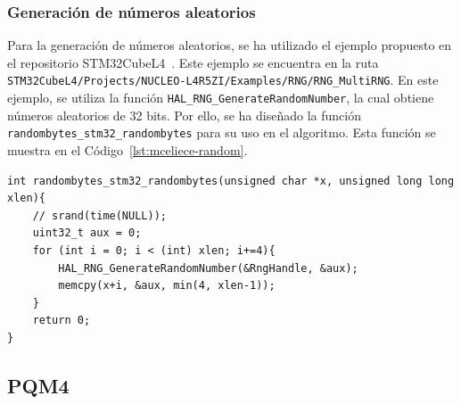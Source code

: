 \subsubsection{Generación de números aleatorios}\label{subsubsec:stm32-random}

Para la generación de números aleatorios, se ha utilizado el ejemplo propuesto en el repositorio STM32CubeL4~\cite{stm32cube}.
Este ejemplo se encuentra en la ruta \texttt{STM32CubeL4/Projects/NUCLEO-L4R5ZI/Examples/RNG/RNG\_MultiRNG}.
En este ejemplo, se utiliza la función \texttt{HAL\_RNG\_GenerateRandomNumber}, la cual obtiene números aleatorios de 32 bits.
Por ello, se ha diseñado la función \texttt{randombytes\_stm32\_randombytes} para su uso en el algoritmo.
Esta función se muestra en el Código~\ref{lst:mceliece-random}.

\begin{lstlisting}[label={lst:mceliece-random},style=Cnice,firstnumber=1,caption={Función de generación de números aleatorios para McEliece348864.}]
int randombytes_stm32_randombytes(unsigned char *x, unsigned long long xlen){
    // srand(time(NULL));
    uint32_t aux = 0;
    for (int i = 0; i < (int) xlen; i+=4){
        HAL_RNG_GenerateRandomNumber(&RngHandle, &aux);
        memcpy(x+i, &aux, min(4, xlen-1));
    }
    return 0;
}
\end{lstlisting}


\subsection{PQM4}\label{subsec:pqm4}




